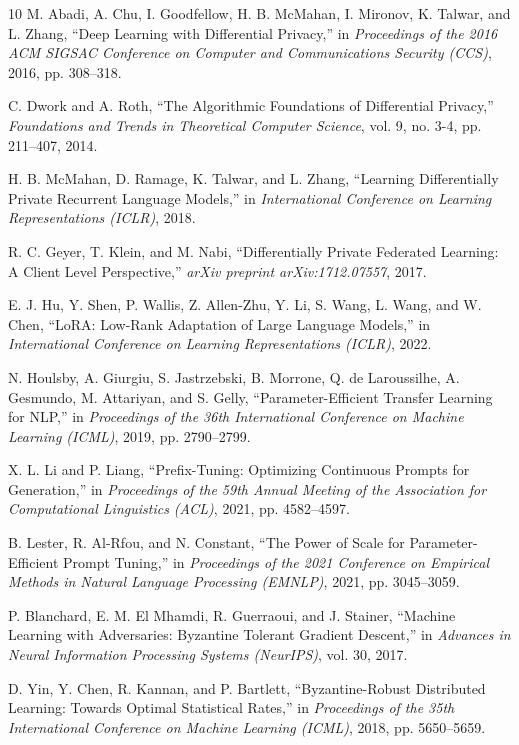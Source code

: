 \documentclass[acmsmall,screen]{acmart}
\begin{document}
\begin{thebibliography}{10}
M. Abadi, A. Chu, I. Goodfellow, H. B. McMahan, I. Mironov, K. Talwar, and L. Zhang,
``Deep Learning with Differential Privacy,''
in \textit{Proceedings of the 2016 ACM SIGSAC Conference on Computer and Communications Security (CCS)}, 2016, pp. 308--318.

C. Dwork and A. Roth,
``The Algorithmic Foundations of Differential Privacy,''
\textit{Foundations and Trends in Theoretical Computer Science}, vol. 9, no. 3-4, pp. 211--407, 2014.

H. B. McMahan, D. Ramage, K. Talwar, and L. Zhang,
``Learning Differentially Private Recurrent Language Models,''
in \textit{International Conference on Learning Representations (ICLR)}, 2018.

R. C. Geyer, T. Klein, and M. Nabi,
``Differentially Private Federated Learning: A Client Level Perspective,''
\textit{arXiv preprint arXiv:1712.07557}, 2017.

E. J. Hu, Y. Shen, P. Wallis, Z. Allen-Zhu, Y. Li, S. Wang, L. Wang, and W. Chen,
``LoRA: Low-Rank Adaptation of Large Language Models,''
in \textit{International Conference on Learning Representations (ICLR)}, 2022.

N. Houlsby, A. Giurgiu, S. Jastrzebski, B. Morrone, Q. de Laroussilhe, A. Gesmundo, M. Attariyan, and S. Gelly,
``Parameter-Efficient Transfer Learning for NLP,''
in \textit{Proceedings of the 36th International Conference on Machine Learning (ICML)}, 2019, pp. 2790--2799.

X. L. Li and P. Liang,
``Prefix-Tuning: Optimizing Continuous Prompts for Generation,''
in \textit{Proceedings of the 59th Annual Meeting of the Association for Computational Linguistics (ACL)}, 2021, pp. 4582--4597.

B. Lester, R. Al-Rfou, and N. Constant,
``The Power of Scale for Parameter-Efficient Prompt Tuning,''
in \textit{Proceedings of the 2021 Conference on Empirical Methods in Natural Language Processing (EMNLP)}, 2021, pp. 3045--3059.

P. Blanchard, E. M. El Mhamdi, R. Guerraoui, and J. Stainer,
``Machine Learning with Adversaries: Byzantine Tolerant Gradient Descent,''
in \textit{Advances in Neural Information Processing Systems (NeurIPS)}, vol. 30, 2017.

D. Yin, Y. Chen, R. Kannan, and P. Bartlett,
``Byzantine-Robust Distributed Learning: Towards Optimal Statistical Rates,''
in \textit{Proceedings of the 35th International Conference on Machine Learning (ICML)}, 2018, pp. 5650--5659.


\end{thebibliography}
\end{document}
